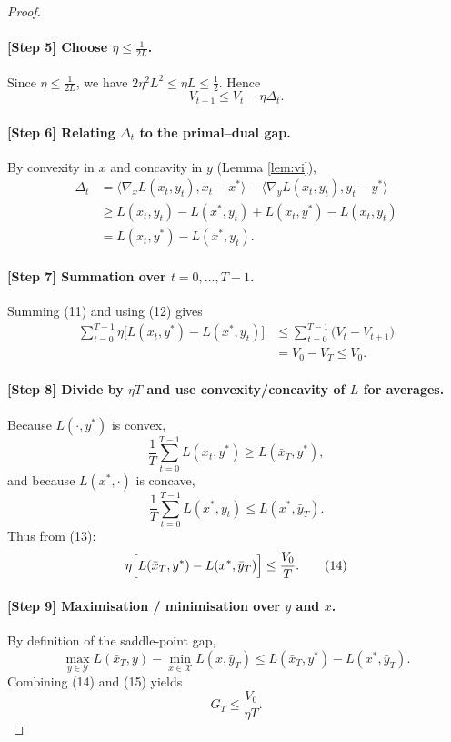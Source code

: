 \documentclass{article}
\begin{document}
\begin{proof}
\paragraph{[Step 5] Choose $\eta\le \frac{1}{2L}$.}
Since $\eta\le \frac{1}{2L}$, we have $2\eta^2L^2\le\eta L\le\frac{1}{2}$. Hence
\[
V_{t+1}\le V_t-\eta\Delta_t .
\tag{11}
\]

\paragraph{[Step 6] Relating $\Delta_t$ to the primal–dual gap.}
By convexity in $x$ and concavity in $y$ (Lemma \ref{lem:vi}),
\[
\begin{aligned}
\Delta_t
&= \langle\nabla_x L(x_t,y_t),x_t-x^*\rangle
-\langle\nabla_y L(x_t,y_t),y_t-y^*\rangle\\
&\ge L(x_t,y_t)-L(x^*,y_t)+L(x_t,y^*)-L(x_t,y_t)\\
&= L(x_t,y^*)-L(x^*,y_t).
\end{aligned}
\tag{12}
\]

\paragraph{[Step 7] Summation over $t=0,\dots,T-1$.}
Summing (11) and using (12) gives
\[
\begin{aligned}
\sum_{t=0}^{T-1}\eta\bigl[L(x_t,y^*)-L(x^*,y_t)\bigr]
&\le \sum_{t=0}^{T-1}\bigl(V_t-V_{t+1}\bigr)\\
&= V_0-V_T\le V_0 .
\end{aligned}
\tag{13}
\]

\paragraph{[Step 8] Divide by $\eta T$ and use convexity/concavity of $L$ for averages.}
Because $L(\cdot ,y^*)$ is convex,
\[
\frac{1}{T}\sum_{t=0}^{T-1}L(x_t,y^*)\ge L\!\left(\bar{x}_T,y^*\right),
\]
and because $L(x^*,\cdot )$ is concave,
\[
\frac{1}{T}\sum_{t=0}^{T-1}L(x^*,y_t)\le L\!\left(x^*,\bar{y}_T\right).
\]
Thus from (13):
\[
\eta\Bigl[L(\bar{x}_T,y^*)-L(x^*,\bar{y}_T)\Bigr]\le \frac{V_0}{T}.
\tag{14}
\]

\paragraph{[Step 9] Maximisation / minimisation over $y$ and $x$.}
By definition of the saddle‑point gap,
\[
\max_{y\in\mathcal{Y}}L(\bar{x}_T,y)-\min_{x\in\mathcal{X}}L(x,\bar{y}_T)
\le L(\bar{x}_T,y^*)-L(x^*,\bar{y}_T).
\tag{15}
\]
Combining (14) and (15) yields
\[
G_T\le \frac{V_0}{\eta T}.
\tag{16}
\]


\end{proof}
\end{document}
